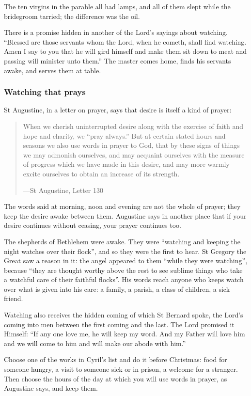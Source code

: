 The ten virgins in the parable all had lamps, and all of them slept while the
bridegroom tarried; the difference was the oil.

There is a promise hidden in another of the Lord's sayings about watching.
``Blessed are those servants whom the Lord, when he cometh, shall find
watching. Amen I say to you that he will gird himself and make them sit down to
meat and passing will minister unto them.'' The master comes home, finds his
servants awake, and serves them at table.

\subsubsection*{Watching that prays}

St Augustine, in a letter on prayer, says that desire is itself a kind of
prayer:

\begin{quote}
When we cherish uninterrupted desire along with the exercise of faith and hope
and charity, we ``pray always.'' But at certain stated hours and seasons we
also use words in prayer to God, that by these signs of things we may admonish
ourselves, and may acquaint ourselves with the measure of progress which we
have made in this desire, and may more warmly excite ourselves to obtain an
increase of its strength.\par
{\smallskip\noindent\small ---St Augustine, Letter 130\par}
\end{quote}

The words said at morning, noon and evening are not the whole of prayer; they
keep the desire awake between them. Augustine says in another place that if
your desire continues without ceasing, your prayer continues too.

The shepherds of Bethlehem were awake. They were ``watching and keeping the
night watches over their flock'', and so they were the first to hear. St
Gregory the Great saw a reason in it:
the angel appeared to them ``while they were watching'', because ``they are
thought worthy above the rest to see sublime things who take a watchful care
of their faithful flocks''. His words reach anyone who keeps watch over what is
given into his care: a family, a parish, a class of children, a sick friend.

Watching also receives the hidden coming of which St Bernard spoke, the Lord's
coming into men between the first coming and the last. The Lord promised it
Himself: ``If any one love me, he will keep my word. And my Father will love
him and we will come to him and will make our abode with him.''

Choose one of the works in Cyril's list and do it before Christmas: food for
someone hungry, a visit to someone sick or in prison, a welcome for a stranger.
Then choose the hours of the day at which you will use words in prayer, as
Augustine says, and keep them.
